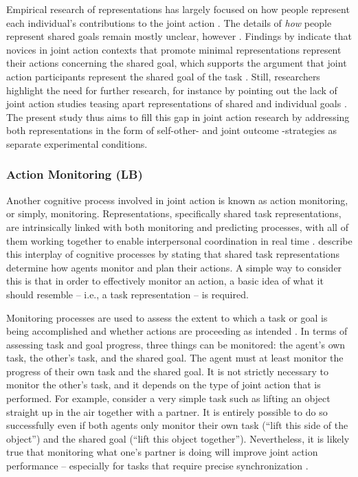 \documentclass[10pt,a4paper,onecolumn]{article}
\begin{document}
Empirical research of representations has largely focused on how people represent each individual's contributions to the joint action \autocite{knoblichPsychologicalResearchJoint2011,loehrSoundYouMe2016}. The details of \emph{how} people represent shared goals remain mostly unclear, however \autocite{loehrSoundYouMe2016}. Findings by \textcite{loehrSoundYouMe2016} indicate that novices in joint action contexts that promote minimal representations represent their actions concerning the shared goal, which supports the argument that joint action participants represent the shared goal of the task \autocite{vesperMinimalArchitectureJoint2010}. Still, researchers highlight the need for further research, for instance by pointing out the lack of joint action studies teasing apart representations of shared and individual goals \autocite{loehrSoundYouMe2016}. The present study thus aims to fill this gap in joint action research by addressing both representations in the form of self-other- and joint outcome -strategies as separate experimental conditions.

\hypertarget{action-monitoring-lb}{%
\subsubsection{Action Monitoring (LB)}\label{action-monitoring-lb}}

Another cognitive process involved in joint action is known as action monitoring, or simply, monitoring. Representations, specifically shared task representations, are intrinsically linked with both monitoring and predicting processes, with all of them working together to enable interpersonal coordination in real time \autocite{knoblichPsychologicalResearchJoint2011}. \textcite{knoblichPsychologicalResearchJoint2011} describe this interplay of cognitive processes by stating that shared task representations determine how agents monitor and plan their actions. A simple way to consider this is that in order to effectively monitor an action, a basic idea of what it should resemble -- i.e., a task representation -- is required.

Monitoring processes are used to assess the extent to which a task or goal is being accomplished and whether actions are proceeding as intended \autocite{botvinickConflictMonitoringCognitive2001}. In terms of assessing task and goal progress, three things can be monitored: the agent's own task, the other's task, and the shared goal. The agent must at least monitor the progress of their own task and the shared goal. It is not strictly necessary to monitor the other's task, and it depends on the type of joint action that is performed. For example, consider a very simple task such as lifting an object straight up in the air together with a partner. It is entirely possible to do so successfully even if both agents only monitor their own task (``lift this side of the object'') and the shared goal (``lift this object together''). Nevertheless, it is likely true that monitoring what one's partner is doing will improve joint action performance -- especially for tasks that require precise synchronization \autocite{vesperMinimalArchitectureJoint2010}.
\end{document}
